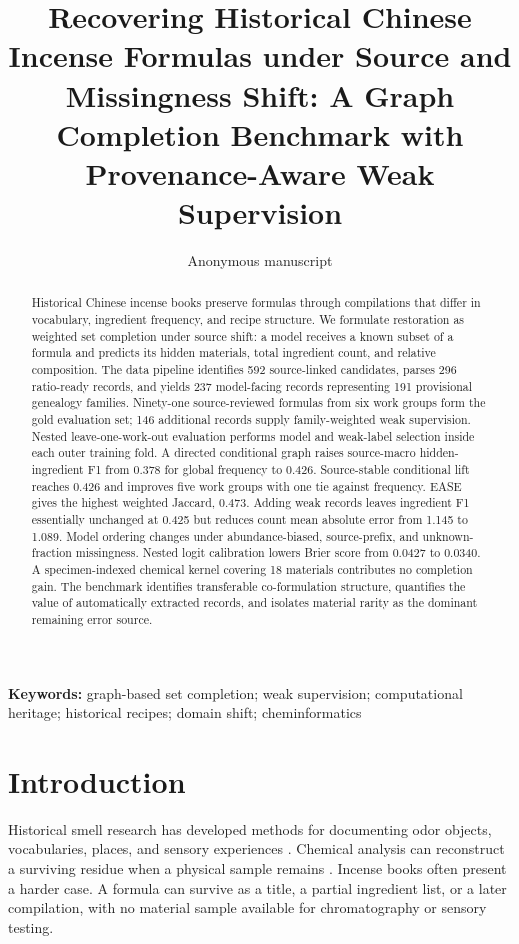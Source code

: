 \documentclass[11pt,a4paper]{article}
\title{Recovering Historical Chinese Incense Formulas under Source and Missingness Shift: A Graph Completion Benchmark with Provenance-Aware Weak Supervision}
\author{Anonymous manuscript}
\date{}
\begin{document}
\maketitle

\begin{abstract}
Historical Chinese incense books preserve formulas through compilations that differ in vocabulary, ingredient frequency, and recipe structure. We formulate restoration as weighted set completion under source shift: a model receives a known subset of a formula and predicts its hidden materials, total ingredient count, and relative composition. The data pipeline identifies 592 source-linked candidates, parses 296 ratio-ready records, and yields 237 model-facing records representing 191 provisional genealogy families. Ninety-one source-reviewed formulas from six work groups form the gold evaluation set; 146 additional records supply family-weighted weak supervision. Nested leave-one-work-out evaluation performs model and weak-label selection inside each outer training fold. A directed conditional graph raises source-macro hidden-ingredient F1 from 0.378 for global frequency to 0.426. Source-stable conditional lift reaches 0.426 and improves five work groups with one tie against frequency. EASE gives the highest weighted Jaccard, 0.473. Adding weak records leaves ingredient F1 essentially unchanged at 0.425 but reduces count mean absolute error from 1.145 to 1.089. Model ordering changes under abundance-biased, source-prefix, and unknown-fraction missingness. Nested logit calibration lowers Brier score from 0.0427 to 0.0340. A specimen-indexed chemical kernel covering 18 materials contributes no completion gain. The benchmark identifies transferable co-formulation structure, quantifies the value of automatically extracted records, and isolates material rarity as the dominant remaining error source.
\end{abstract}

\noindent\textbf{Keywords:} graph-based set completion; weak supervision; computational heritage; historical recipes; domain shift; cheminformatics

\section{Introduction}

Historical smell research has developed methods for documenting odor objects, vocabularies, places, and sensory experiences \citep{bembibre2017_smell_heritage,lisena2022_odeuropa}. Chemical analysis can reconstruct a surviving residue when a physical sample remains \citep{paolin2026_historical_smells}. Incense books often present a harder case. A formula can survive as a title, a partial ingredient list, or a later compilation, with no material sample available for chromatography or sensory testing.
\end{document}
